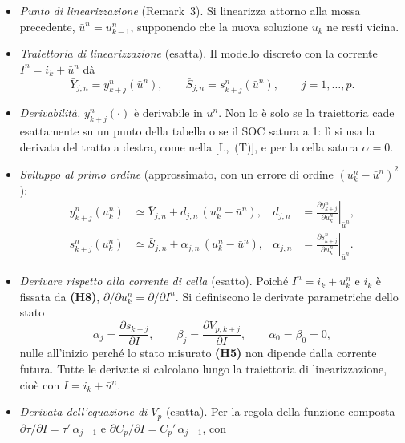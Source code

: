 \documentclass[11pt,a4paper]{article}
\newcommand{\ip}[1]{\textbf{(H#1)}}         %
\begin{document}
\begin{itemize}
  \item[\ip{12}] \emph{Punto di linearizzazione} (Remark~3). Si linearizza
        attorno alla mossa precedente, $\bar u^n = u^n_{k-1}$, supponendo che
        la nuova soluzione $u_k$ ne resti vicina.
  \item \emph{Traiettoria di linearizzazione} (esatta). Il modello discreto
        con la corrente $I^n = i_k + \bar u^n$ dà
        \[
          \bar Y_{j,n} = y^n_{k+j}(\bar u^n) , \qquad
          \bar S_{j,n} = s^n_{k+j}(\bar u^n) , \qquad j = 1, \dots, p .
        \]
  \item[\ip{13}] \emph{Derivabilità.} $y^n_{k+j}(\cdot)$ è derivabile in
        $\bar u^n$. Non lo è solo se la traiettoria cade esattamente su un
        punto della tabella o se il SOC satura a 1: lì si usa la derivata del
        tratto a destra, come nella [L,~(T)], e per la cella satura
        $\alpha = 0$.
  \item \emph{Sviluppo al primo ordine} (approssimato, con un errore di
        ordine $(u^n_k - \bar u^n)^2$):
        \[
        \begin{aligned}
          y^n_{k+j}(u^n_k) &\simeq \bar Y_{j,n} + d_{j,n}\,(u^n_k - \bar u^n) , &
          d_{j,n} &= \left.\frac{\partial y^n_{k+j}}{\partial u^n_k}\right|_{\bar u^n} , \\
          s^n_{k+j}(u^n_k) &\simeq \bar S_{j,n} + \alpha_{j,n}\,(u^n_k - \bar u^n) , &
          \alpha_{j,n} &= \left.\frac{\partial s^n_{k+j}}{\partial u^n_k}\right|_{\bar u^n} .
        \end{aligned}
        \tag*{[L,~(6)]}
        \]
  \item \emph{Derivare rispetto alla corrente di cella} (esatto). Poiché
        $I^n = i_k + u^n_k$ e $i_k$ è fissata da \ip{8},
        $\partial/\partial u^n_k = \partial/\partial I^n$. Si definiscono le
        derivate parametriche dello stato
        \[
          \alpha_j = \frac{\partial s_{k+j}}{\partial I} , \qquad
          \beta_j = \frac{\partial V_{p,k+j}}{\partial I} , \qquad
          \alpha_0 = \beta_0 = 0 ,
        \]
        nulle all'inizio perché lo stato misurato \ip{5} non dipende dalla
        corrente futura. Tutte le derivate si calcolano lungo la traiettoria
        di linearizzazione, cioè con $I = i_k + \bar u^n$.
  \item \emph{Derivata dell'equazione di $V_p$} (esatta). Per la regola della
        funzione composta $\partial\tau/\partial I = \tau'\,\alpha_{j-1}$ e
        $\partial C_p/\partial I = C_p'\,\alpha_{j-1}$, con

\end{itemize}
\end{document}
